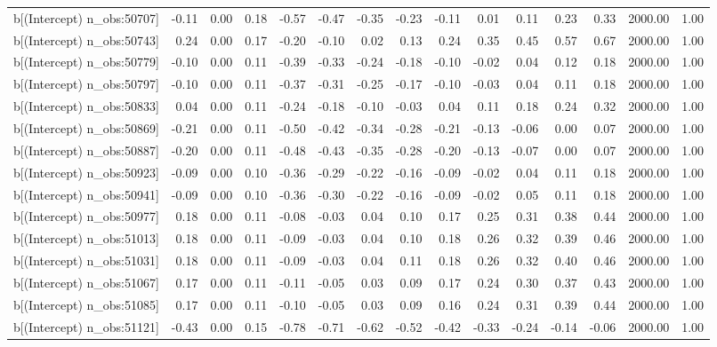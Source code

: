 \begin{table}[ht]
\begin{tabular}{rrrrrrrrrrrrrrr}
  b[(Intercept) n\_obs:50707] & -0.11 & 0.00 & 0.18 & -0.57 & -0.47 & -0.35 & -0.23 & -0.11 & 0.01 & 0.11 & 0.23 & 0.33 & 2000.00 & 1.00 \\ 
  b[(Intercept) n\_obs:50743] & 0.24 & 0.00 & 0.17 & -0.20 & -0.10 & 0.02 & 0.13 & 0.24 & 0.35 & 0.45 & 0.57 & 0.67 & 2000.00 & 1.00 \\ 
  b[(Intercept) n\_obs:50779] & -0.10 & 0.00 & 0.11 & -0.39 & -0.33 & -0.24 & -0.18 & -0.10 & -0.02 & 0.04 & 0.12 & 0.18 & 2000.00 & 1.00 \\ 
  b[(Intercept) n\_obs:50797] & -0.10 & 0.00 & 0.11 & -0.37 & -0.31 & -0.25 & -0.17 & -0.10 & -0.03 & 0.04 & 0.11 & 0.18 & 2000.00 & 1.00 \\ 
  b[(Intercept) n\_obs:50833] & 0.04 & 0.00 & 0.11 & -0.24 & -0.18 & -0.10 & -0.03 & 0.04 & 0.11 & 0.18 & 0.24 & 0.32 & 2000.00 & 1.00 \\ 
  b[(Intercept) n\_obs:50869] & -0.21 & 0.00 & 0.11 & -0.50 & -0.42 & -0.34 & -0.28 & -0.21 & -0.13 & -0.06 & 0.00 & 0.07 & 2000.00 & 1.00 \\ 
  b[(Intercept) n\_obs:50887] & -0.20 & 0.00 & 0.11 & -0.48 & -0.43 & -0.35 & -0.28 & -0.20 & -0.13 & -0.07 & 0.00 & 0.07 & 2000.00 & 1.00 \\ 
  b[(Intercept) n\_obs:50923] & -0.09 & 0.00 & 0.10 & -0.36 & -0.29 & -0.22 & -0.16 & -0.09 & -0.02 & 0.04 & 0.11 & 0.18 & 2000.00 & 1.00 \\ 
  b[(Intercept) n\_obs:50941] & -0.09 & 0.00 & 0.10 & -0.36 & -0.30 & -0.22 & -0.16 & -0.09 & -0.02 & 0.05 & 0.11 & 0.18 & 2000.00 & 1.00 \\ 
  b[(Intercept) n\_obs:50977] & 0.18 & 0.00 & 0.11 & -0.08 & -0.03 & 0.04 & 0.10 & 0.17 & 0.25 & 0.31 & 0.38 & 0.44 & 2000.00 & 1.00 \\ 
  b[(Intercept) n\_obs:51013] & 0.18 & 0.00 & 0.11 & -0.09 & -0.03 & 0.04 & 0.10 & 0.18 & 0.26 & 0.32 & 0.39 & 0.46 & 2000.00 & 1.00 \\ 
  b[(Intercept) n\_obs:51031] & 0.18 & 0.00 & 0.11 & -0.09 & -0.03 & 0.04 & 0.11 & 0.18 & 0.26 & 0.32 & 0.40 & 0.46 & 2000.00 & 1.00 \\ 
  b[(Intercept) n\_obs:51067] & 0.17 & 0.00 & 0.11 & -0.11 & -0.05 & 0.03 & 0.09 & 0.17 & 0.24 & 0.30 & 0.37 & 0.43 & 2000.00 & 1.00 \\ 
  b[(Intercept) n\_obs:51085] & 0.17 & 0.00 & 0.11 & -0.10 & -0.05 & 0.03 & 0.09 & 0.16 & 0.24 & 0.31 & 0.39 & 0.44 & 2000.00 & 1.00 \\ 
  b[(Intercept) n\_obs:51121] & -0.43 & 0.00 & 0.15 & -0.78 & -0.71 & -0.62 & -0.52 & -0.42 & -0.33 & -0.24 & -0.14 & -0.06 & 2000.00 & 1.00 \\ 

\end{tabular}
\end{table}
